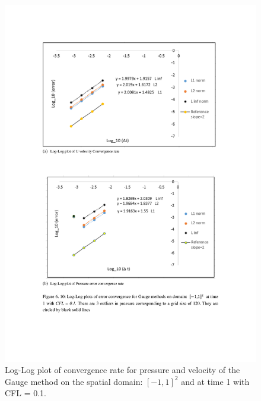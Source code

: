 \begin{figure}[H]
	\centering
	\includegraphics[scale=0.9]{figures/Gauge_pf2_rate_t_1_cfl_0_1.pdf}
	\caption{Log-Log plot of convergence rate for pressure and velocity of the Gauge method on the spatial domain: $[-1,1]^2$ and at time 1 with CFL = 0.1. }\label{fig:6.11}
\end{figure}

